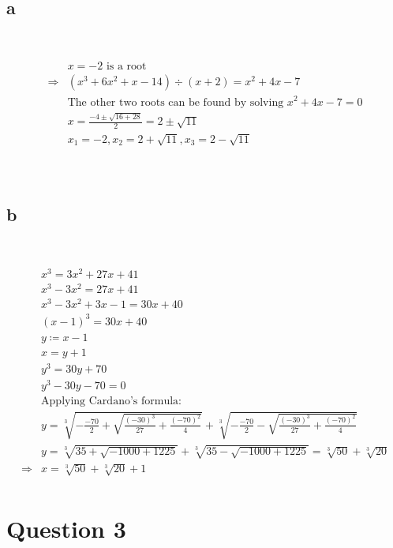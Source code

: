 \documentclass{article}
\begin{document}
~

\subsection*{a}

~

\begin{align*}
    &x=-2\text{ is a root}\\
    \Rightarrow&(x^3+6x^2+x-14)\div(x+2)=x^2+4x-7\\
    &\text{The other two roots can be found by solving } x^2+4x-7=0\\
    &x=\frac{-4\pm\sqrt{16+28}}{2}=2\pm\sqrt{11}\\
    &x_1=-2,x_2=2+\sqrt{11},x_3=2-\sqrt{11}\\
\end{align*}

~

\subsection*{b}

~

\begin{align*}
    &x^3=3x^2+27x+41\\
    &x^3-3x^2=27x+41\\
    &x^3-3x^2+3x-1=30x+40\\
    &(x-1)^3=30x+40\\
    &y\coloneqq x-1\\
    &x=y+1\\
    &y^3=30y+70\\
    &y^3-30y-70=0\\
    &\text{Applying Cardano's formula}:\\
    &y=\sqrt[3]{-\frac{-70}{2}+\sqrt{\frac{(-30)^3}{27}+\frac{(-70)^2}{4}}}+\sqrt[3]{-\frac{-70}{2}-\sqrt{\frac{(-30)^3}{27}+\frac{(-70)^2}{4}}}\\
    &y=\sqrt[3]{35+\sqrt{-1000+1225}}+\sqrt[3]{35-\sqrt{-1000+1225}}=\sqrt[3]{50}+\sqrt[3]{20}\\
    \Rightarrow&x=\sqrt[3]{50}+\sqrt[3]{20}+1\\
\end{align*}

\newpage

\section*{Question 3}
\end{document}
